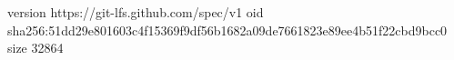 version https://git-lfs.github.com/spec/v1
oid sha256:51dd29e801603c4f15369f9df56b1682a09de7661823e89ee4b51f22cbd9bcc0
size 32864
